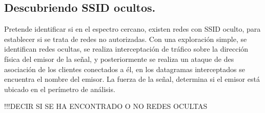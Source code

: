 \subsection{Descubriendo SSID ocultos.}

Pretende identificar si en el espectro cercano, existen redes con SSID oculto, para establecer si se trata de redes no autorizadas. Con una exploración simple, se identifican redes ocultas, se realiza interceptación de tráfico sobre la dirección física del emisor de la señal, y posteriormente se realiza un ataque de des asociación de los clientes conectados a él, en los datagramas interceptados se encuentra el nombre del emisor. La fuerza de la señal, determina si el emisor está ubicado en el perímetro de análisis.

!!!DECIR SI SE HA ENCONTRADO O NO REDES OCULTAS
